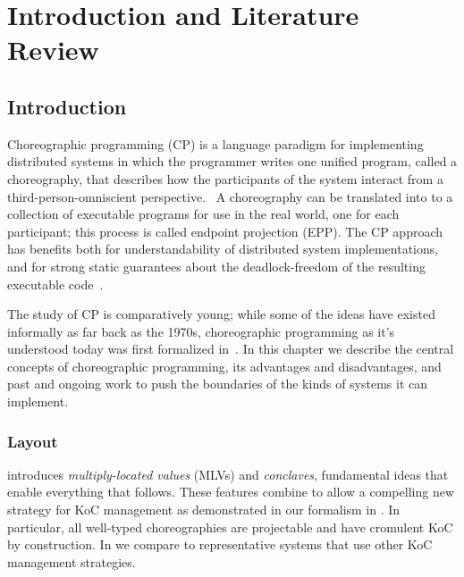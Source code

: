 \chapter{Introduction and Literature Review}

\section{Introduction}
\label{sec:introduction}

Choreographic programming (CP)
is a language paradigm for implementing distributed systems in which the programmer writes one unified program, called a choreography,
that describes how the participants of the system interact
from a third-person-omniscient perspective.~
A choreography can be translated into to a collection of executable programs for use in the real world, one for each participant;
this process is called endpoint projection (EPP).
The CP approach has benefits both for understandability of distributed system implementations,
and for strong static guarantees about the deadlock-freedom of the resulting executable code~\cite{montesi-carbone-dfbd}.

The study of CP is comparatively young; while some of the ideas have existed informally as far back as the 1970s,
choreographic programming as it's understood today was first formalized in~.
In this chapter we describe the central concepts of choreographic programming,
its advantages and disadvantages,
and past and ongoing work to push the boundaries of the kinds of systems it can implement.

\subsection{Layout}

 introduces \emph{multiply-located values} (MLVs)
and \emph{conclaves}, fundamental ideas that enable everything that follows.
These features combine to allow a compelling new strategy for KoC management
as demonstrated in our formalism \HLSCentral in .
In particular, all well-typed \HLSCentral choreographies are projectable and have cromulent KoC by construction.
In  we compare \HLSCentral to representative systems that use other KoC management strategies.


